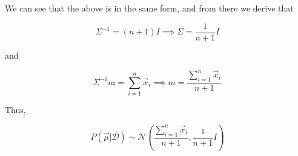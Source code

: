 \documentclass[11pt]{article}
\begin{document}
\begin{enumerate}
		\pagebreak
		
		We can see that the above is in the same form, and from there we derive that 
		
		\[\Sigma^{-1} = (n+1) I \implies \Sigma = \frac{1}{n+1} I\]
		
		and 
		
		\[\Sigma^{-1}m = \sum_{i=1}^n\vec{x}_i \implies m = \frac{\sum_{i=1}^n\vec{x}_i}{n+1}\]
		
		Thus, 
		
		\[\boxed{P(\vec{\mu} | \mathcal{D}) \sim \mathcal{N} \left (\frac{\sum_{i=1}^n\vec{x}_i}{n+1}, \frac{1}{n+1} I \right )}\]
		    
		\end{enumerate}
\end{document}
